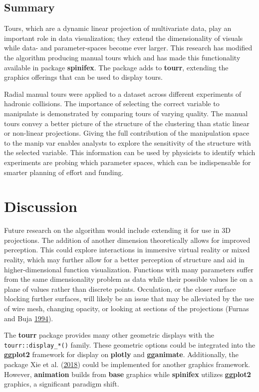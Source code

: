 \hypertarget{sec:summary}{%
\subsection{Summary}\label{sec:summary}}

Tours, which are a dynamic linear projection of multivariate data, play
an important role in data visualization; they extend the dimensionality
of visuals while data- and parameter-spaces become ever larger. This
research has modified the algorithm producing manual tours which and has
made this functionality available in package \textbf{spinifex}. The
package adds to \textbf{tourr}, extending the graphics offerings that
can be used to display tours.

Radial manual tours were applied to a dataset across different
experiments of hadronic collisions. The importance of selecting the
correct variable to manipulate is demonstrated by comparing tours of
varying quality. The manual tours convey a better picture of the
structure of the clustering than static linear or non-linear
projections. Giving the full contribution of the manipulation space to
the manip var enables analysts to explore the sensitivity of the
structure with the selected variable. This information can be used by
physicists to identify which experiments are probing which parameter
spaces, which can be indispensable for smarter planning of effort and
funding.

\hypertarget{sec:discussion}{%
\section{Discussion}\label{sec:discussion}}

Future research on the algorithm would include extending it for use in
3D projections. The addition of another dimension theoretically allows
for improved perception. This could explore interactions in immersive
virtual reality or mixed reality, which may further allow for a better
perception of structure and aid in higher-dimensional function
visualization. Functions with many parameters suffer from the same
dimensionality problem as data while their possible values lie on a
plane of values rather than discrete points. Occulation, or the closer
surface blocking further surfaces, will likely be an issue that may be
alleviated by the use of wire mesh, changing opacity, or looking at
sections of the projections (Furnas and Buja
\protect\hyperlink{ref-furnas_prosection_1994}{1994}).

The \textbf{tourr} package provides many other geometric displays with
the \texttt{tourr::display\_*()} family. These geometric options could
be integrated into the \textbf{ggplot2} framework for display on
\textbf{plotly} and \textbf{gganimate}. Additionally, the
 package Xie et al.
(\protect\hyperlink{ref-xie_animation:_2018}{2018}) could be implemented
for another graphics framework. However, \textbf{animation} builds from
\textbf{base} graphics while \textbf{spinifex} utilizes \textbf{ggplot2}
graphics, a significant paradigm shift.


